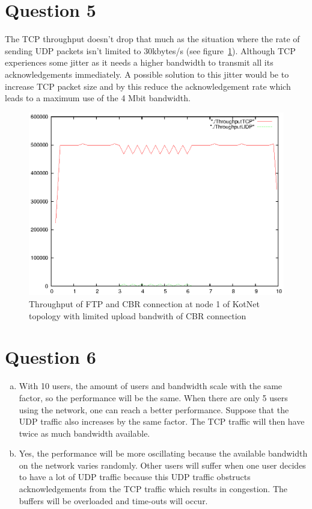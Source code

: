 \documentclass[a4paper]{report}
\begin{document}
\section*{Question 5}
The TCP throughput doesn't drop that much as the situation where the rate of sending UDP packets isn't limited to 30kbytes/s (see figure~\ref{ex1:question5}). Although TCP experiences some jitter as it needs a higher bandwidth to transmit all its acknowledgements immediately. A possible solution to this jitter would be to increase TCP packet size and by this reduce the acknowledgement rate which leads to a maximum use of the 4 Mbit bandwidth.
\begin{figure}[h]
\centerline{\includegraphics{pictures/E1Q5.eps}}
\caption{Throughput of FTP and CBR connection at node 1 of KotNet topology with limited upload bandwith of CBR connection}
\label{ex1:question5}
\end{figure}
\newpage
\section*{Question 6}
\begin{enumerate}[a)]
\item
With 10 users, the amount of users and bandwidth scale with the same factor, so the performance will be the same.
When there are only 5 users using the network, one can reach a better performance. Suppose that the UDP traffic also increases by the same factor. The TCP traffic will then have twice as much bandwidth available.
\item
Yes, the performance will be more oscillating because the available bandwidth on the network varies randomly. Other users will suffer when one user decides to have a lot of UDP traffic because this UDP traffic obstructs acknowledgements from the TCP traffic which results in congestion. The buffers will be overloaded and time-outs will occur.
\end{enumerate}
\end{document}
